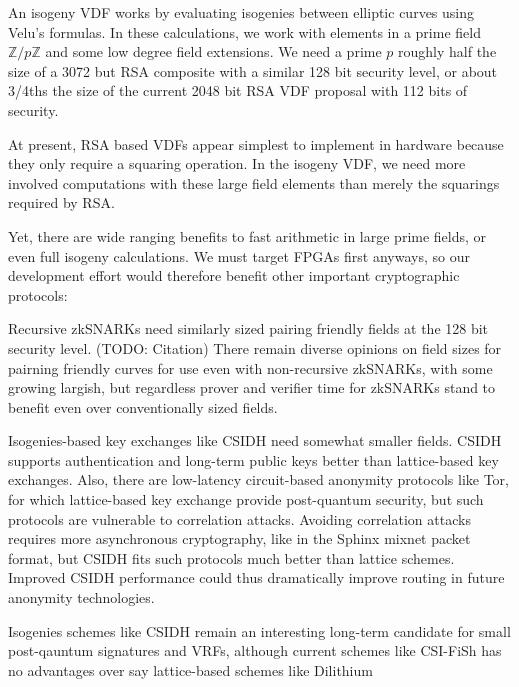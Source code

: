 \documentclass{article}
\newcommand{\Z}{\mathbb{Z}}
\begin{document}
An isogeny VDF works by evaluating isogenies between elliptic curves
using Velu's formulas.  In these calculations, we work with elements
in a prime field $\Z/p\Z$ and some low degree field extensions. 
We need a prime $p$ roughly half the size of a 3072 but RSA composite
with a similar 128 bit security level, or about 3/4ths the size of the
current 2048 bit RSA VDF proposal with 112 bits of security.

At present, RSA based VDFs appear simplest to implement in hardware
because they only require a squaring operation. %
In the isogeny VDF, we need more involved computations with these
large field elements than merely the squarings required by RSA. 

Yet, there are wide ranging benefits to fast arithmetic in large
prime fields, or even full isogeny calculations.  We must target
FPGAs first anyways, so our development effort would therefore
benefit other important cryptographic protocols:
 
Recursive zkSNARKs need similarly sized pairing friendly fields at
the 128 bit security level.  (TODO: Citation)
There remain diverse opinions on field sizes for pairning friendly
curves for use even with non-recursive zkSNARKs, with some growing
largish, but regardless prover and verifier time for zkSNARKs stand
to benefit even over conventionally sized fields.  

Isogenies-based key exchanges like CSIDH \cite{CSIDH} need somewhat
smaller fields.  CSIDH supports authentication and long-term public
keys better than lattice-based key exchanges. 
Also, there are low-latency circuit-based anonymity protocols like Tor,
for which lattice-based key exchange provide post-quantum security,
but such protocols are vulnerable to correlation attacks. 
Avoiding correlation attacks requires more asynchronous cryptography,
like in the Sphinx mixnet packet format, but CSIDH fits such protocols
much better than lattice schemes.  Improved CSIDH performance could
thus dramatically improve routing in future anonymity technologies.

Isogenies schemes like CSIDH remain an interesting long-term candidate
for small post-qauntum signatures and VRFs, although current schemes
like CSI-FiSh \cite{CSI-FiSh} has no advantages over say lattice-based
schemes like Dilithium \cite{Dilithium}
\end{document}
